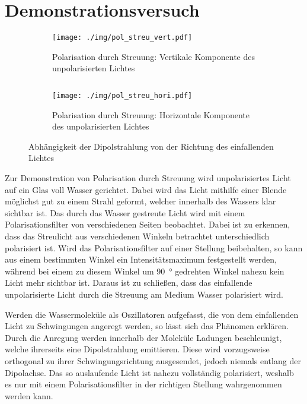 \chapter{Demonstrationsversuch}
\begin{figure}[tb]
	\begin{subfigure}{.4\textwidth}
		\centering
		\texttt{[image: ./img/pol\_streu\_vert.pdf]}
		\caption[Vertikale Komponente]{Polarisation durch Streuung: Vertikale Komponente des unpolarisierten Lichtes}
	\end{subfigure}
	$\quad$
	\begin{subfigure}{.4\textwidth}
		\centering
		\texttt{[image: ./img/pol\_streu\_hori.pdf]}
		\caption[Horizontale Komponente]{Polarisation durch Streuung: Horizontale Komponente des unpolarisierten Lichtes}
	\end{subfigure}
	\caption[Visualisierung der Richtungsabhängigkeiten]{Abhängigkeit der Dipolstrahlung von der Richtung des einfallenden Lichtes}
	\label{fig:pol_streu}
\end{figure}

Zur Demonstration von Polarisation durch Streuung wird unpolarisiertes Licht auf ein Glas voll Wasser gerichtet.
Dabei wird das Licht mithilfe einer Blende möglichst gut zu einem Strahl geformt, welcher innerhalb des Wassers klar sichtbar ist.
Das durch das Wasser gestreute Licht wird mit einem Polarisationsfilter von verschiedenen Seiten beobachtet.
Dabei ist zu erkennen, dass das Streulicht aus verschiedenen Winkeln betrachtet unterschiedlich polarisiert ist.
Wird das Polarisationsfilter auf einer Stellung beibehalten, so kann aus einem bestimmten Winkel ein Intensitätsmaximum festgestellt werden, während bei einem zu diesem Winkel um \SI{90}{\degree} gedrehten Winkel nahezu kein Licht mehr sichtbar ist.
Daraus ist zu schließen, dass das einfallende unpolarisierte Licht durch die Streuung am Medium Wasser polarisiert wird.\par
Werden die Wassermoleküle als Oszillatoren aufgefasst, die von dem einfallenden Licht zu Schwingungen angeregt werden, so lässt sich das Phänomen erklären.
Durch die Anregung werden innerhalb der Moleküle Ladungen beschleunigt, welche ihrerseits eine Dipolstrahlung emittieren.
Diese wird vorzugsweise orthogonal zu ihrer Schwingungsrichtung ausgesendet, jedoch niemals entlang der Dipolachse.
Das so auslaufende Licht ist nahezu vollständig polarisiert, weshalb es nur mit einem Polarisationsfilter in der richtigen Stellung wahrgenommen werden kann.
